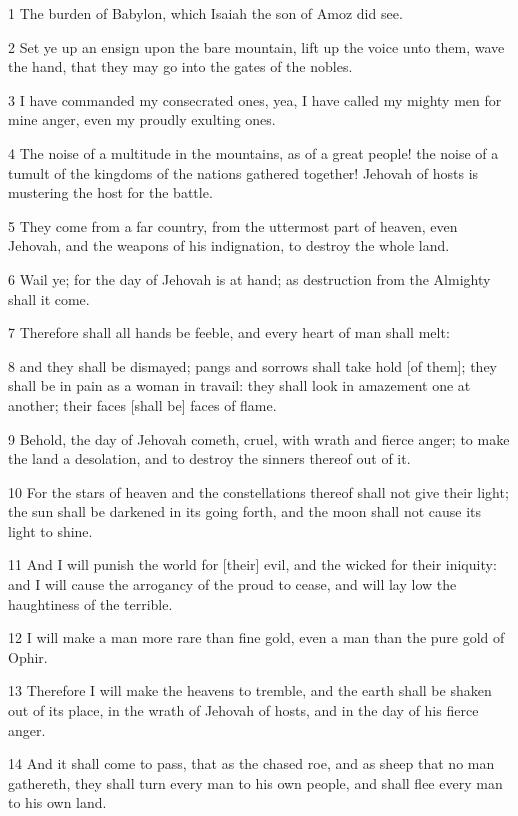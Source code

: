 \par 1 The burden of Babylon, which Isaiah the son of Amoz did see.
\par 2 Set ye up an ensign upon the bare mountain, lift up the voice unto them, wave the hand, that they may go into the gates of the nobles.
\par 3 I have commanded my consecrated ones, yea, I have called my mighty men for mine anger, even my proudly exulting ones.
\par 4 The noise of a multitude in the mountains, as of a great people! the noise of a tumult of the kingdoms of the nations gathered together! Jehovah of hosts is mustering the host for the battle.
\par 5 They come from a far country, from the uttermost part of heaven, even Jehovah, and the weapons of his indignation, to destroy the whole land.
\par 6 Wail ye; for the day of Jehovah is at hand; as destruction from the Almighty shall it come.
\par 7 Therefore shall all hands be feeble, and every heart of man shall melt:
\par 8 and they shall be dismayed; pangs and sorrows shall take hold [of them]; they shall be in pain as a woman in travail: they shall look in amazement one at another; their faces [shall be] faces of flame.
\par 9 Behold, the day of Jehovah cometh, cruel, with wrath and fierce anger; to make the land a desolation, and to destroy the sinners thereof out of it.
\par 10 For the stars of heaven and the constellations thereof shall not give their light; the sun shall be darkened in its going forth, and the moon shall not cause its light to shine.
\par 11 And I will punish the world for [their] evil, and the wicked for their iniquity: and I will cause the arrogancy of the proud to cease, and will lay low the haughtiness of the terrible.
\par 12 I will make a man more rare than fine gold, even a man than the pure gold of Ophir.
\par 13 Therefore I will make the heavens to tremble, and the earth shall be shaken out of its place, in the wrath of Jehovah of hosts, and in the day of his fierce anger.
\par 14 And it shall come to pass, that as the chased roe, and as sheep that no man gathereth, they shall turn every man to his own people, and shall flee every man to his own land.
